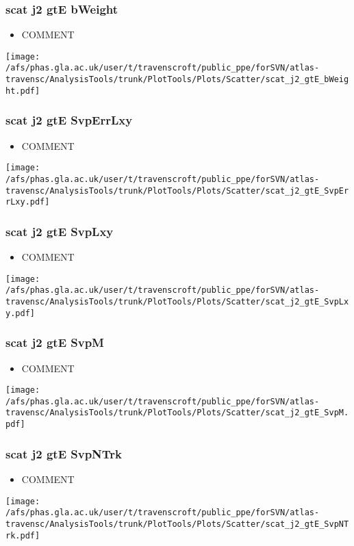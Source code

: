 \documentclass{beamer}
\begin{document}
\begin{frame}
\frametitle{scat j2 gtE bWeight}
\begin{itemize}
\item COMMENT
\end{itemize}
\begin{center}
\texttt{[image: /afs/phas.gla.ac.uk/user/t/travenscroft/public\_ppe/forSVN/atlas-travensc/AnalysisTools/trunk/PlotTools/Plots/Scatter/scat\_j2\_gtE\_bWeight.pdf]}
\end{center}
\end{frame}

\begin{frame}
\frametitle{scat j2 gtE SvpErrLxy}
\begin{itemize}
\item COMMENT
\end{itemize}
\begin{center}
\texttt{[image: /afs/phas.gla.ac.uk/user/t/travenscroft/public\_ppe/forSVN/atlas-travensc/AnalysisTools/trunk/PlotTools/Plots/Scatter/scat\_j2\_gtE\_SvpErrLxy.pdf]}
\end{center}
\end{frame}

\begin{frame}
\frametitle{scat j2 gtE SvpLxy}
\begin{itemize}
\item COMMENT
\end{itemize}
\begin{center}
\texttt{[image: /afs/phas.gla.ac.uk/user/t/travenscroft/public\_ppe/forSVN/atlas-travensc/AnalysisTools/trunk/PlotTools/Plots/Scatter/scat\_j2\_gtE\_SvpLxy.pdf]}
\end{center}
\end{frame}

\begin{frame}
\frametitle{scat j2 gtE SvpM}
\begin{itemize}
\item COMMENT
\end{itemize}
\begin{center}
\texttt{[image: /afs/phas.gla.ac.uk/user/t/travenscroft/public\_ppe/forSVN/atlas-travensc/AnalysisTools/trunk/PlotTools/Plots/Scatter/scat\_j2\_gtE\_SvpM.pdf]}
\end{center}
\end{frame}

\begin{frame}
\frametitle{scat j2 gtE SvpNTrk}
\begin{itemize}
\item COMMENT
\end{itemize}
\begin{center}
\texttt{[image: /afs/phas.gla.ac.uk/user/t/travenscroft/public\_ppe/forSVN/atlas-travensc/AnalysisTools/trunk/PlotTools/Plots/Scatter/scat\_j2\_gtE\_SvpNTrk.pdf]}
\end{center}
\end{frame}
\end{document}
